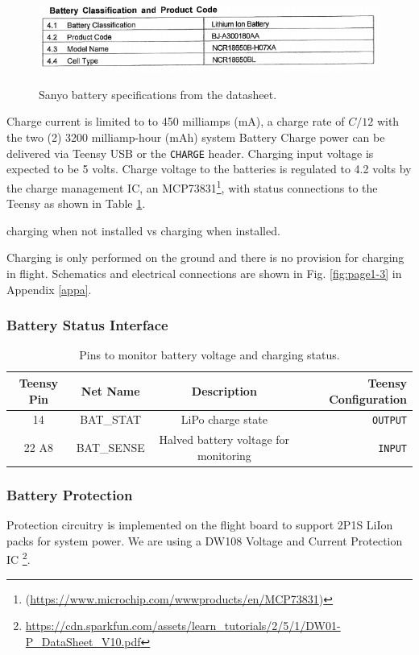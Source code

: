 \documentclass{article}
\begin{document}
\begin{figure}[h!]
	\centering
	\includegraphics[width=12cm]{images/battery-spec.png}
	\label{fig:bat-spec}
	\caption{Sanyo battery specifications from the datasheet.}
\end{figure}

Charge current is limited to to 450 milliamps (mA), a charge rate of $C/12$ with the two (2) 3200 milliamp-hour (mAh) system  Battery Charge power can be delivered via Teensy USB or the \texttt{CHARGE} header. Charging input voltage is expected to be 5 volts. Charge voltage to the batteries is regulated to 4.2 volts by the charge management IC, an MCP73831\footnote{ (\url{https://www.microchip.com/wwwproducts/en/MCP73831})}, with status connections to the Teensy as shown in Table \ref{tab:pins-battery}. 

charging when not installed vs charging when installed.

Charging is only performed on the ground and there is no provision for charging in flight. Schematics and electrical connections are shown in Fig. \ref{fig:page1-3} in Appendix \ref{appa}.

\subsubsection{Battery Status Interface}
\begin{table}[H]
    \centering
    \caption{Pins to monitor battery voltage and charging status.}
	\label{tab:pins-battery}
    \begin{tabular}{c|c|c|r}
    Teensy Pin & Net Name  & Description   & Teensy Configuration \\
    \hline 
    14 & BAT\_STAT & LiPo charge state & \texttt{OUTPUT} \\
    22 A8 & BAT\_SENSE    &  Halved battery voltage for monitoring &   \texttt{INPUT} 
    \end{tabular}
\end{table}

\subsubsection{Battery Protection}
Protection circuitry is implemented on the flight board to support 2P1S LiIon packs for system power. We are using a DW108 Voltage and Current Protection IC \footnote{\url{https://cdn.sparkfun.com/assets/learn_tutorials/2/5/1/DW01-P_DataSheet_V10.pdf}}.
\end{document}
